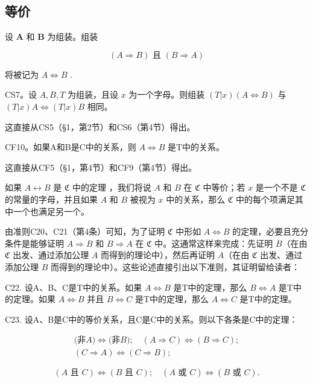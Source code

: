 \subsection{等价}

设 \(\pmb{A}\) 和 \(\pmb{B}\) 为组装。组装

\[
(A \Longrightarrow B) \text { 且 } (B \Longrightarrow A)
\]

将被记为 \(A \Longleftrightarrow B\) .

CS7。设 \(A, B, T\) 为组装，且设 \(x\) 为一个字母。则组装 \((T|x)(A \Longleftrightarrow B)\) 与 \((T|x)A \Longleftrightarrow (T|x)B\) 相同。

这直接从CS5（§1，第2节）和CS6（第4节）得出。

CF10。如果A和B是C中的关系，则 \(A \Longleftrightarrow B\) 是T中的关系。

这直接从CF5（§1，第4节）和CF9（第4节）得出。

如果 \(A \leftrightarrow B\) 是 \(\mathfrak{C}\) 中的定理 ，我们将说 \(A\) 和 \(B\) 在 \(\mathfrak{C}\) 中等价；若 \(x\) 是一个不是 \(\mathfrak{C}\) 的常量的字母，并且如果 \(A\) 和 \(B\) 被视为 \(x\) 中的关系，那么 \(\mathfrak{C}\) 中的每个项满足其中一个也满足另一个。

由准则C20、C21（第4条）可知，为了证明 \(\mathfrak{C}\) 中形如 \(A \Longleftrightarrow B\) 的定理，必要且充分条件是能够证明 \(A \Longrightarrow B\) 和 \(B \Longrightarrow A\) 在 \(\mathfrak{C}\) 中。这通常这样来完成：先证明 \(B\)（在由 \(\mathfrak{C}\) 出发、通过添加公理 \(A\) 而得到的理论中），然后再证明 \(A\)（在由 \(\mathfrak{C}\) 出发、通过添加公理 \(B\) 而得到的理论中）。这些论述直接引出以下准则，其证明留给读者：

C22. 设A、B、C是T中的关系。如果 \(A \Longleftrightarrow B\) 是T中的定理，那么 \(B \Longleftrightarrow A\) 是T中的定理。如果 \(A \Longleftrightarrow B\) 并且 \(B \Longleftrightarrow C\) 是T中的定理，那么 \(A \Longleftrightarrow C\) 是T中的定理。

C23. 设A、B是C中的等价关系，且C是C中的关系。则以下各条是C中的定理：

\[
\begin{array}{c} \text {(非} A) \iff \text {(非} B); \quad (A \Rightarrow C) \iff (B \Rightarrow C); \\ (C \Rightarrow A) \iff (C \Rightarrow B); \end{array}
\]

\[
(A \text {   且   } C) \Longleftrightarrow (B \text {   且   } C); \quad (A \text {   或   } C) \Longleftrightarrow (B \text {   或   } C).
\]

